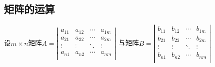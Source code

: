 \documentclass[a4paper,10pt]{article}
\begin{document}
\begin{CJK}{UTF8}{song}
\subsection{矩阵的运算}
设$m\times n$矩阵$
A=\left|
\begin{array}{cccc}
a_{11} & a_{12} & \cdots & a_{1m} \\
a_{21} & a_{22} & \cdots & a_{2m} \\
\vdots & \vdots & \ddots & \vdots \\
a_{n1} & a_{n2} & \cdots & a_{nm} \\
\end{array}
   \right|
$
与矩阵$
B=\left|
\begin{array}{cccc}
b_{11} & b_{12} & \cdots & b_{1m} \\
b_{21} & b_{22} & \cdots & b_{2m} \\
\vdots & \vdots & \ddots & \vdots \\
b_{n1} & b_{n2} & \cdots & b_{nm} \\
\end{array}
   \right|
$


\end{CJK}
\end{document}

